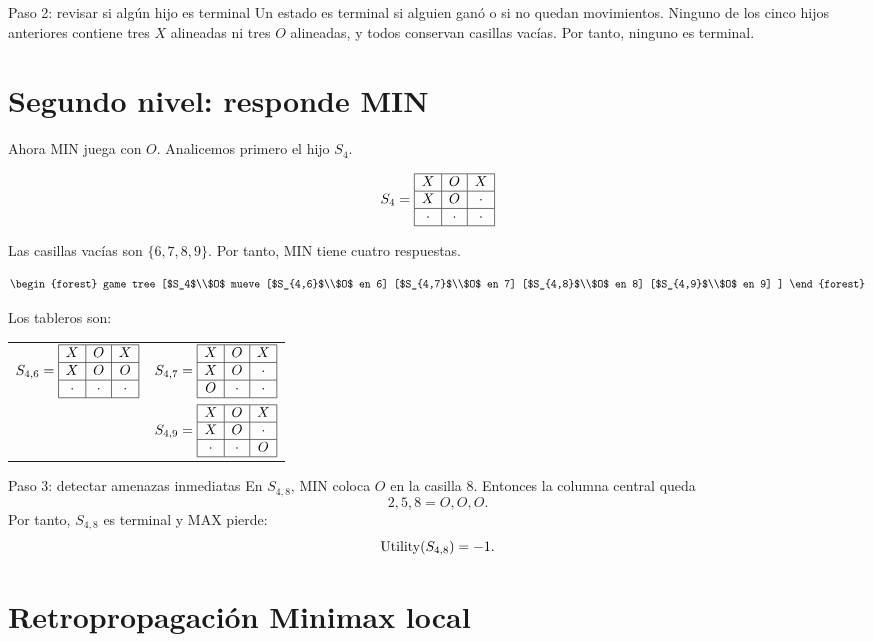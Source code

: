 \begin{stepbox}{Paso 2: revisar si algún hijo es terminal}
Un estado es terminal si alguien ganó o si no quedan movimientos. Ninguno de los cinco hijos anteriores contiene tres $X$ alineadas ni tres $O$ alineadas, y todos conservan casillas vacías. Por tanto, ninguno es terminal.
\end{stepbox}

\section{Segundo nivel: responde MIN}

Ahora MIN juega con $O$. Analicemos primero el hijo $S_4$.

\[
S_4=\begin{array}{|c|c|c|}\hline X & O & X \\ \hline X & O & \cdot \\ \hline \cdot & \cdot & \cdot \\ \hline \end{array}
\]

Las casillas vacías son $\{6,7,8,9\}$. Por tanto, MIN tiene cuatro respuestas.

\[
\begin{forest}
game tree
[$S_4$\\$O$ mueve
  [$S_{4,6}$\\$O$ en 6]
  [$S_{4,7}$\\$O$ en 7]
  [$S_{4,8}$\\$O$ en 8]
  [$S_{4,9}$\\$O$ en 9]
]
\end{forest}
\]

Los tableros son:

\begin{center}
\begin{tabular}{cc}
$S_{4,6}=\begin{array}{|c|c|c|}\hline X & O & X \\ \hline X & O & O \\ \hline \cdot & \cdot & \cdot \\ \hline \end{array}$ &
$S_{4,7}=\begin{array}{|c|c|c|}\hline X & O & X \\ \hline X & O & \cdot \\ \hline O & \cdot & \cdot \\ \hline \end{array}$ \\\[5mm]
$S_{4,8}=\board{X}{O}{X}{X}{O}{\blank}{\blank}{O}{\blank}$ &
$S_{4,9}=\board{X}{O}{X}{X}{O}{\blank}{\blank}{\blank}{O}$
\end{tabular}
\end{center}

\begin{stepbox}{Paso 3: detectar amenazas inmediatas}
En $S_{4,8}$, MIN coloca $O$ en la casilla 8. Entonces la columna central queda
\[
2,5,8 = O,O,O.
\]
Por tanto, $S_{4,8}$ es terminal y MAX pierde:
\[
\operatorname{Utility}(S_{4,8})=-1.
\]
\end{stepbox}

\section{Retropropagación Minimax local}

